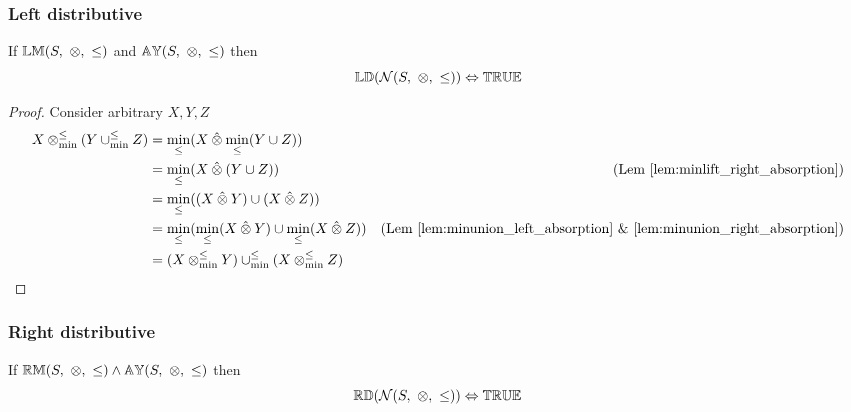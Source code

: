 \documentclass[../Summary.tex]{subfiles}
\begin{document}
\subsubsection{Left distributive}

\begin{theorem} \label{thm:N_ld}
If ${\mathbb{LM}}(S,\ \otimes,\ \leq)$ and ${\mathbb{AY}}(S,\ \otimes, \ \leq)$ then
\begin{equation*}
\propname{LD}(\mathcal{N}(S,\ \otimes,\ \leq))  \Leftrightarrow \propname{TRUE}
\end{equation*}
\end{theorem}


\begin{proof}

\vspace{0.5em}
Consider arbitrary $X,Y,Z$
\begin{align*}
X \mathbin{\otimes_{\min}^{\leq}} (Y \mathbin{\cup_{\min}^{\leq}} Z) 	& = \min_\leq(X \mathbin{\hat{\otimes}} \min_\leq(Y \cup Z)) \\
							& = \min_\leq(X \mathbin{\hat{\otimes}} (Y \cup Z)) & \text{(Lem~\ref{lem:minlift_right_absorption})} \\
							& = \min_\leq((X \mathbin{\hat{\otimes}} Y) \cup (X \mathbin{\hat{\otimes}} Z)) \\
							& = \min_\leq(\min_\leq(X \mathbin{\hat{\otimes}} Y) \cup \min_\leq(X \mathbin{\hat{\otimes}} Z)) & \text{(Lem \ref{lem:minunion_left_absorption} \& \ref{lem:minunion_right_absorption})} \\
							& = (X \mathbin{\otimes_{\min}^{\leq}} Y) \mathbin{\cup_{\min}^{\leq}} (X \mathbin{\otimes_{\min}^{\leq}} Z)
\end{align*}
\end{proof}




\subsubsection{Right distributive}

\begin{theorem} \label{thm:N_rd}
If ${\mathbb{RM}}(S,\ \otimes,\ \leq) \wedge {\mathbb{AY}}(S,\ \otimes, \ \leq)$ then
\begin{equation*}
\propname{RD}(\mathcal{N}(S,\ \otimes,\ \leq))  \Leftrightarrow \propname{TRUE}
\end{equation*}
\end{theorem}
 
\end{document}
